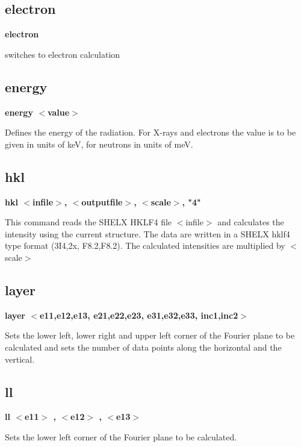 \subsection*{electron}
{\bf electron \par }
\par
\vspace{3pt}
switches to electron calculation 
\subsection*{energy}
{\bf energy $ <$value$> $ \par }
\par
\vspace{3pt}
Defines the energy of the radiation. 
For X-rays and electrons the value is to be given in units of keV, 
for neutrons in units of meV. 
\subsection*{hkl}
{\bf  hkl $ <$infile$> $, $ <$outputfile$> $, $ <$scale$> $, "4" \par }
\par
\vspace{3pt}
This command reads the SHELX HKLF4 file $ <$infile$> $ and calculates 
the intensity using the current structure. The data are written 
in a SHELX hklf4 type format (3I4,2x, F8.2,F8.2). 
The calculated intensities are multiplied by $ <$scale$> $ 
\subsection*{layer}
{\bf layer $ <$e11,e12,e13, e21,e22,e23, e31,e32,e33, inc1,inc2$> $ \par }
\par
\vspace{3pt}
Sets the lower left, lower right and upper left corner of the 
Fourier plane to be calculated and sets the number of data 
points along the horizontal and the vertical. 
\subsection*{ll}
{\bf ll $ <$e11$> $ , $ <$e12$> $ , $ <$e13$> $ \par }
\par
\vspace{3pt}
Sets the lower left corner of the Fourier plane to be calculated. 
